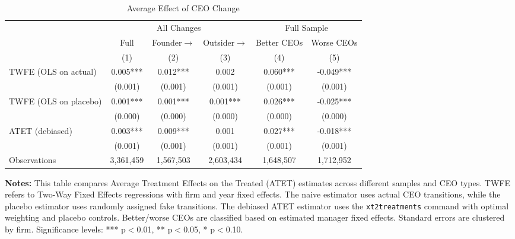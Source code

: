 \begin{table}[]
    \centering
    \caption{Average Effect of CEO Change}
    \vspace{.2cm}
    \label{tab:placeholder}
\begin{tabular}{lccccc}
\toprule
 & \multicolumn{3}{c}{All Changes} & \multicolumn{2}{c}{Full Sample} \\
\cmidrule(lr){2-4} \cmidrule(lr){5-6}
 & Full & Founder$\to$ & Outsider$\to$ & Better CEOs & Worse CEOs \\
 & (1) & (2) & (3) & (4) & (5) \\
\midrule
TWFE (OLS on actual) & 0.005*** & 0.012*** & 0.002 & 0.060*** & -0.049*** \\
  & (0.001) & (0.001) & (0.001) & (0.001) & (0.001) \\
TWFE (OLS on placebo) & 0.001*** & 0.001*** & 0.001*** & 0.026*** & -0.025*** \\
  & (0.000) & (0.000) & (0.000) & (0.000) & (0.000) \\
ATET (debiased) & 0.003*** & 0.009*** & 0.001 & 0.027*** & -0.018*** \\
  & (0.001) & (0.001) & (0.001) & (0.001) & (0.001) \\ \hline
Observations & 3,361,459 & 1,567,503 & 2,603,434 & 1,648,507 & 1,712,952 \\
\bottomrule
\end{tabular}
   \begin{minipage}{16cm}
   \vspace{.2cm}
\footnotesize
\textbf{Notes:} This table compares Average Treatment Effects on the Treated (ATET) estimates 
across different samples and CEO types. TWFE refers to Two-Way Fixed Effects regressions 
with firm and year fixed effects. The naive estimator uses actual CEO transitions, 
while the placebo estimator uses randomly assigned fake transitions. The debiased 
ATET estimator uses the \texttt{xt2treatments} command with optimal weighting and 
placebo controls. Better/worse CEOs are classified based on estimated manager fixed effects. 
Standard errors are clustered by firm. Significance levels: *** p$<$0.01, ** p$<$0.05, * p$<$0.10.
   \end{minipage}
\end{table}



